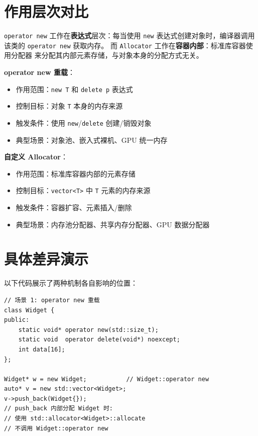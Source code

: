 \documentclass[12pt,a4paper,fontset=fandol]{ctexbook}
\begin{document}
\section{作用层次对比}

\texttt{operator new} 工作在\textbf{表达式}层次：每当使用 \texttt{new}
表达式创建对象时，编译器调用该类的 \texttt{operator new} 获取内存。
而 \texttt{Allocator} 工作在\textbf{容器内部}：标准库容器使用分配器
来分配其内部元素存储，与对象本身的分配方式无关。

\begin{compare}[title=operator new vs Allocator]
\textbf{operator new 重载}：
\begin{itemize}
    \item 作用范围：\texttt{new T} 和 \texttt{delete p} 表达式
    \item 控制目标：对象 \texttt{T} 本身的内存来源
    \item 触发条件：使用 \texttt{new}/\allowbreak{}\texttt{delete} 创建/销毁对象
    \item 典型场景：对象池、嵌入式裸机、GPU 统一内存
\end{itemize}

\textbf{自定义 Allocator}：
\begin{itemize}
    \item 作用范围：标准库容器内部的元素存储
    \item 控制目标：\texttt{vector<T>} 中 \texttt{T} 元素的内存来源
    \item 触发条件：容器扩容、元素插入/删除
    \item 典型场景：内存池分配器、共享内存分配器、GPU 数据分配器
\end{itemize}
\end{compare}

\section{具体差异演示}

以下代码展示了两种机制各自影响的位置：

\begin{lstlisting}
// 场景 1: operator new 重载
class Widget {
public:
    static void* operator new(std::size_t);
    static void  operator delete(void*) noexcept;
    int data[16];
};

Widget* w = new Widget;           // Widget::operator new
auto* v = new std::vector<Widget>;
v->push_back(Widget{});
// push_back 内部分配 Widget 时:
// 使用 std::allocator<Widget>::allocate
// 不调用 Widget::operator new
\end{lstlisting}
\end{document}
